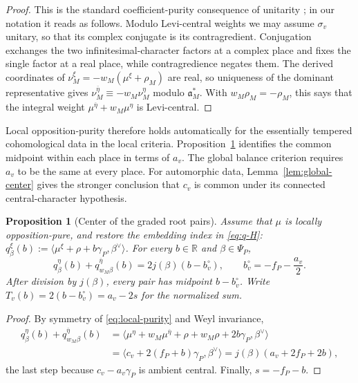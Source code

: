 \documentclass[12pt]{amsart}
\numberwithin{equation}{section}
\theoremstyle{plain}
\newtheorem{proposition}[theorem]{Proposition}
\theoremstyle{definition}
\theoremstyle{remark}
\renewcommand{\bar}{\overline}
\begin{document}
\begin{proof}
This is the standard coefficient-purity consequence of unitarity \cite[Ch.~II, Proposition~6.12(1) and \S6.13]{BorelWallach}; in our notation it reads as follows. Modulo Levi-central weights we may assume $\sigma_v$ unitary, so that its complex conjugate is its contragredient. Conjugation exchanges the two infinitesimal-character factors at a complex place and fixes the single factor at a real place, while contragredience negates them. The derived coordinates of $\nu_M^\xi=-w_M(\mu^\xi+\rho_M)$ are real, so uniqueness of the dominant representative gives $\nu_M^{\bar\eta}\equiv-w_M\nu_M^\eta$ modulo $\mathfrak a_M^*$. With $w_M\rho_M=-\rho_M$, this says that the integral weight $\mu^{\bar\eta}+w_M\mu^\eta$ is Levi-central.
\end{proof}

Local opposition-purity therefore holds automatically for the essentially tempered cohomological data in the local criteria. Proposition~\ref{prop:root-centering} identifies the common midpoint within each place in terms of $a_v$. The global balance criterion requires $a_v$ to be the same at every place. For automorphic data, Lemma~\ref{lem:global-center} gives the stronger conclusion that $c_v$ is common under its connected central-character hypothesis.

\begin{proposition}[Center of the graded root pairs]\label{prop:root-centering}
Assume that $\mu$ is locally opposition-pure, and restore the embedding index in \eqref{eq:q-H}: $q_\beta^\xi(b):=\langle\mu^\xi+\rho+b\gamma_P,\beta^\vee\rangle$. For every $b\in\mathbb R$ and $\beta\in\Psi_P$, 
\begin{equation}\label{eq:root-centering}
 q_\beta^\eta(b)+q_{w_M\beta}^{\bar\eta}(b)
   =2j(\beta)(b-b_v^\circ),\qquad b_v^\circ=-f_P-\frac{a_v}{2}.
\end{equation}
After division by $j(\beta)$, every pair has midpoint $b-b_v^\circ$. Write $T_v(b)=2(b-b_v^\circ)=a_v-2s$ for the normalized sum. 
\end{proposition}

\begin{proof}
By symmetry of \eqref{eq:local-purity} and Weyl invariance,
\[
 \begin{aligned}
 q_\beta^\eta(b)+q_{w_M\beta}^{\bar\eta}(b)
 &=\langle\mu^\eta+w_M\mu^{\bar\eta}
        +\rho+w_M\rho+2b\gamma_P,\beta^\vee\rangle\\
 &=\langle c_v+2(f_P+b)\gamma_P,\beta^\vee\rangle
 =j(\beta)(a_v+2f_P+2b),
 \end{aligned}
\]
the last step because $c_v-a_v\gamma_P$ is ambient central. Finally, $s=-f_P-b$.
\end{proof}
\end{document}
